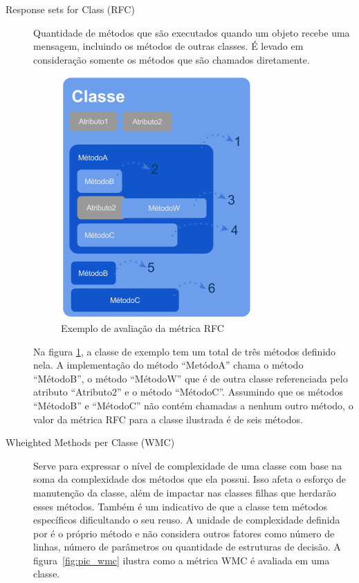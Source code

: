 \documentclass[conference]{IEEEtran}
\begin{document}
\begin{description}



\item[Response sets for Class (RFC)] Quantidade de métodos que são executados
quando um objeto recebe uma mensagem, incluindo os métodos de outras classes. É
levado em consideração somente os métodos que são chamados diretamente.

\begin{figure}[htb]
	\begin{center}
		\includegraphics[scale=0.6]{img/pic_rfc.png}
	\end{center}
	\caption{\label{fig:pic_rfc}Exemplo de avaliação da métrica RFC}
\end{figure}


Na figura \ref{fig:pic_rfc}, a classe de exemplo tem um total de três métodos
definido nela. A implementação do método ``MetódoA'' chama o método ``MétodoB'',
o método ``MétodoW'' que é de outra classe referenciada pelo atributo
``Atributo2'' e o método ``MétodoC''. Assumindo que os métodos ``MétodoB'' e
``MétodoC'' não contém chamadas a nenhum outro método, o valor da métrica RFC
para a classe ilustrada é de seis métodos.

\item[Wheighted Methods per Classe (WMC)] Serve para expressar o nível de
complexidade de uma classe com base na soma da complexidade dos métodos que ela
possui. Isso afeta o esforço de manutenção da classe, além de impactar nas
classes filhas que herdarão esses métodos. Também é um indicativo de que a
classe tem métodos específicos dificultando o seu reuso. A unidade de
complexidade definida por  é o próprio método e não
considera outros fatores como número de linhas, número de parâmetros ou
quantidade de estruturas de decisão. A figura~\ref{fig:pic_wmc} ilustra como a
métrica WMC é avaliada em uma classe.


\end{description}
\end{document}
